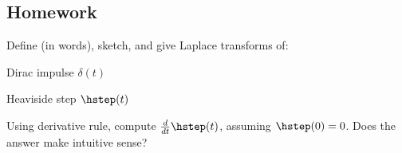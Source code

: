 \subsection*{Homework}

\begin{question}
  \begin{fullwidth}
  Define (in words), sketch, and give Laplace transforms of:
  \begin{colenumerate}
  \item Dirac impulse \(\delta(t)\)
  \item Heaviside step \(\hstep(t)\)
  \end{colenumerate}
\end{fullwidth}
\solspace{1.25in}
Using derivative rule, compute \(\frac{d}{dt}\hstep(t)\), assuming \(\hstep(0) = 0\). Does the answer make intuitive sense?
\solspace{0.25in}
\end{question}

